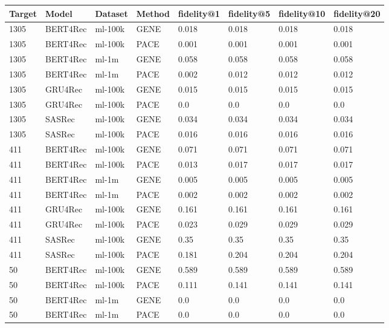 \begingroup
    \setlength{\tabcolsep}{6pt} %
    \renewcommand{\arraystretch}{1.2} %
    \small %
    \begin{longtable}{|l|l|l|l|l|l|l|l|}
    \hline
\textbf{Target} & \textbf{Model} & \textbf{Dataset} & \textbf{Method} & \textbf{fidelity@1} & \textbf{fidelity@5} & \textbf{fidelity@10} & \textbf{fidelity@20} \\ \hline
\endhead
1305 & BERT4Rec & ml-100k & GENE & 0.018 & 0.018 & 0.018 & 0.018 \\
1305 & BERT4Rec & ml-100k & PACE & 0.001 & 0.001 & 0.001 & 0.001 \\\hline
1305 & BERT4Rec & ml-1m & GENE & 0.058 & 0.058 & 0.058 & 0.058 \\
1305 & BERT4Rec & ml-1m & PACE & 0.002 & 0.012 & 0.012 & 0.012 \\\hline
1305 & GRU4Rec & ml-100k & GENE & 0.015 & 0.015 & 0.015 & 0.015 \\
1305 & GRU4Rec & ml-100k & PACE & 0.0 & 0.0 & 0.0 & 0.0 \\\hline
1305 & SASRec & ml-100k & GENE & 0.034 & 0.034 & 0.034 & 0.034 \\
1305 & SASRec & ml-100k & PACE & 0.016 & 0.016 & 0.016 & 0.016 \\\hline
411 & BERT4Rec & ml-100k & GENE & 0.071 & 0.071 & 0.071 & 0.071 \\
411 & BERT4Rec & ml-100k & PACE & 0.013 & 0.017 & 0.017 & 0.017 \\\hline
411 & BERT4Rec & ml-1m & GENE & 0.005 & 0.005 & 0.005 & 0.005 \\
411 & BERT4Rec & ml-1m & PACE & 0.002 & 0.002 & 0.002 & 0.002 \\\hline
411 & GRU4Rec & ml-100k & GENE & 0.161 & 0.161 & 0.161 & 0.161 \\
411 & GRU4Rec & ml-100k & PACE & 0.023 & 0.029 & 0.029 & 0.029 \\\hline
411 & SASRec & ml-100k & GENE & 0.35 & 0.35 & 0.35 & 0.35 \\
411 & SASRec & ml-100k & PACE & 0.181 & 0.204 & 0.204 & 0.204 \\\hline
50 & BERT4Rec & ml-100k & GENE & 0.589 & 0.589 & 0.589 & 0.589 \\
50 & BERT4Rec & ml-100k & PACE & 0.111 & 0.141 & 0.141 & 0.141 \\\hline
50 & BERT4Rec & ml-1m & GENE & 0.0 & 0.0 & 0.0 & 0.0 \\
50 & BERT4Rec & ml-1m & PACE & 0.0 & 0.0 & 0.0 & 0.0 \\\hline

\end{longtable}
